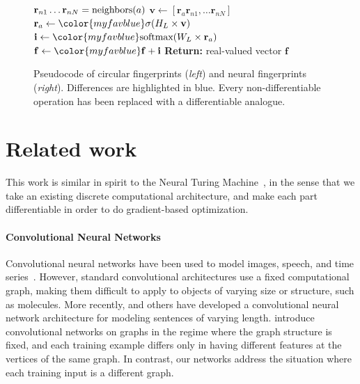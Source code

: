 \documentclass{article}
\newcommand{\vv}{\mathbf{v}}
\newcommand{\vf}{\mathbf{f}}
\newcommand{\vi}{\mathbf{i}}
\newcommand{\vr}{\mathbf{r}}
\begin{document}
\begin{figure}[t]
\begin{minipage}[t]{0.49\columnwidth}
\begin{algorithm}[H]
\begin{algorithmic}[1]
\EndFor
{} 
		\State $\vr_{n1} \dots \vr_{nN} = \textnormal{neighbors}(a)$
		\State $\vv \leftarrow [\vr_a \vr_{n1}, \dots \vr_{nN}]$ 
		\State $\vr_a \leftarrow {\color{myfavblue} \sigma(H_L \times \vv)}$ 
		\State $\vi \leftarrow {\color{myfavblue} \textnormal{softmax}(W_L \times \vr_a)}$ 
		\State $\vf \leftarrow {\color{myfavblue} \vf + \vi}$ 
    \EndFor
\EndFor
\State \textbf{Return:} { {\color{myfavblue} real-valued} vector $\vf$}
\end{algorithmic}
\end{algorithm}
\end{minipage}
\hfill
\caption{Pseudocode of circular fingerprints (\emph{left}) and neural fingerprints (\emph{right}).
Differences are highlighted in blue.
Every non-differentiable operation has been replaced with a differentiable analogue.}
\end{figure}


\section{Related work}
This work is similar in spirit to the Neural Turing Machine~\citep{graves2014neural}, in the sense that we take an existing discrete computational architecture, and make each part differentiable in order to do gradient-based optimization.

\paragraph{Convolutional Neural Networks}
Convolutional neural networks have been used to model images, speech, and time series~\citep{lecun1995convolutional}.
However, standard convolutional architectures use a fixed computational graph, making them difficult to apply to objects of varying size or structure, such as molecules.
More recently, \cite{KalchbrennerACL2014} and others have developed a convolutional neural network architecture for modeling sentences of varying length.
\cite{bruna2013spectral} introduce convolutional networks on graphs in the regime where the graph structure is fixed, and each training example differs only in having different features at the vertices of the same graph.
In contrast, our networks address the situation where each training input is a different graph.
\end{document}
